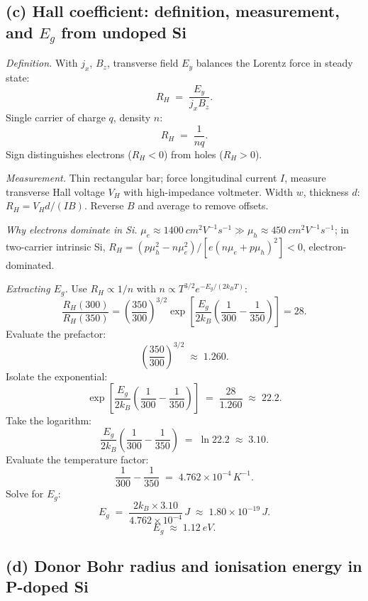\documentclass[11pt]{article}
\begin{document}
\subsection*{(c) Hall coefficient: definition, measurement, and $E_g$ from undoped Si}

\emph{Definition.} With $j_x$, $B_z$, transverse field $E_y$ balances the Lorentz force in steady state:
\begin{equation}
R_H \;=\; \frac{E_y}{j_x B_z}.
\label{eq:RHdef}
\end{equation}
Single carrier of charge $q$, density $n$:
\begin{equation}
\boxed{\;R_H \;=\; \frac{1}{n q}.\;}
\label{eq:RHbox}
\end{equation}
Sign distinguishes electrons ($R_H<0$) from holes ($R_H>0$).

\emph{Measurement.} Thin rectangular bar; force longitudinal current $I$, measure transverse Hall voltage $V_H$ with high-impedance voltmeter. Width $w$, thickness $d$: $R_H=V_Hd/(IB)$. Reverse $B$ and average to remove offsets.

\emph{Why electrons dominate in Si.} $\mu_e\approx \SI{1400}{cm^2 V^{-1} s^{-1}}\gg\mu_h\approx \SI{450}{cm^2 V^{-1} s^{-1}}$; in two-carrier intrinsic Si, $R_H=(p\mu_h^2-n\mu_e^2)/[e(n\mu_e+p\mu_h)^2]<0$, electron-dominated.

\emph{Extracting $E_g$.} Use $R_H\propto 1/n$ with $n\propto T^{3/2}e^{-E_g/(2k_BT)}$:
\begin{equation}
\frac{R_H(300)}{R_H(350)} = \left(\frac{350}{300}\right)^{3/2}\!\exp\!\left[\frac{E_g}{2k_B}\!\left(\frac{1}{300}-\frac{1}{350}\right)\right]=28.
\label{eq:RHratio}
\end{equation}
Evaluate the prefactor:
\[
\left(\frac{350}{300}\right)^{3/2} \;\approx\; 1.260.
\]
Isolate the exponential:
\[
\exp\!\left[\frac{E_g}{2k_B}\!\left(\frac{1}{300}-\frac{1}{350}\right)\right] \;=\; \frac{28}{1.260} \;\approx\; 22.2.
\]
Take the logarithm:
\[
\frac{E_g}{2k_B}\!\left(\frac{1}{300}-\frac{1}{350}\right) \;=\; \ln 22.2 \;\approx\; 3.10.
\]
Evaluate the temperature factor:
\[
\frac{1}{300}-\frac{1}{350} \;=\; 4.762\times 10^{-4}\,\si{K^{-1}}.
\]
Solve for $E_g$:
\[
E_g \;=\; \frac{2k_B\times 3.10}{4.762\times 10^{-4}}\,\si{J} \;\approx\; 1.80\times 10^{-19}\,\si{J}.
\]
\begin{equation}
\boxed{\;E_g \;\approx\; \SI{1.12}{eV}.\;}
\label{eq:Egbox}
\end{equation}

\subsection*{(d) Donor Bohr radius and ionisation energy in P-doped Si}
\end{document}
